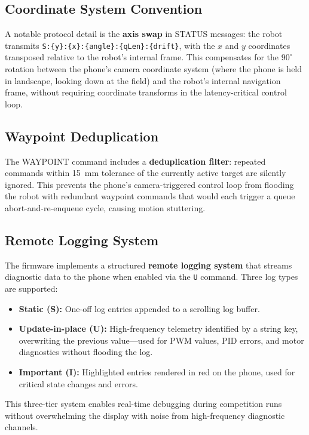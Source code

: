 \documentclass[12pt, a4paper, twoside]{article}
\begin{document}
\subsection{Coordinate System Convention}

A notable protocol detail is the \textbf{axis swap} in STATUS messages: the robot transmits \texttt{S:\{y\}:\{x\}:\{angle\}:\{qLen\}:\{drift\}}, with the $x$ and $y$ coordinates transposed relative to the robot's internal frame. This compensates for the $90^\circ$ rotation between the phone's camera coordinate system (where the phone is held in landscape, looking down at the field) and the robot's internal navigation frame, without requiring coordinate transforms in the latency-critical control loop.

\subsection{Waypoint Deduplication}

The WAYPOINT command includes a \textbf{deduplication filter}: repeated commands within \SI{15}{\milli\metre} tolerance of the currently active target are silently ignored. This prevents the phone's camera-triggered control loop from flooding the robot with redundant waypoint commands that would each trigger a queue abort-and-re-enqueue cycle, causing motion stuttering.

\subsection{Remote Logging System}

The firmware implements a structured \textbf{remote logging system} that streams diagnostic data to the phone when enabled via the \texttt{U} command. Three log types are supported:

\begin{itemize}
    \item \textbf{Static (S):} One-off log entries appended to a scrolling log buffer.
    \item \textbf{Update-in-place (U):} High-frequency telemetry identified by a string key, overwriting the previous value---used for PWM values, PID errors, and motor diagnostics without flooding the log.
    \item \textbf{Important (I):} Highlighted entries rendered in red on the phone, used for critical state changes and errors.
\end{itemize}

This three-tier system enables real-time debugging during competition runs without overwhelming the display with noise from high-frequency diagnostic channels.
\end{document}
